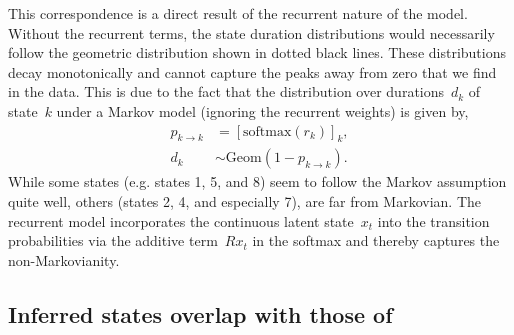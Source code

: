 \documentclass{article}
\begin{document}
This correspondence is a direct result of the recurrent nature of the
model.  Without the recurrent terms, the state duration distributions
would necessarily follow the geometric distribution shown in dotted
black lines.  These distributions decay monotonically and cannot
capture the peaks away from zero that we find in the data.  This is
due to the fact that the distribution over durations~$d_k$ of
state~$k$ under a Markov model (ignoring the recurrent weights) is
given by,
\begin{align*}
  p_{k \to k} &= [\mathrm{softmax}(r_{k})]_k, \\
  d_k &\sim \mathrm{Geom}(1-p_{k \to k}).
\end{align*}
While some states (e.g. states 1, 5, and 8) seem to follow the Markov
assumption quite well, others (states 2, 4, and especially 7), are far
from Markovian.  The recurrent model incorporates the continuous
latent state~$x_t$ into the transition probabilities via the additive
term~$R x_t$ in the softmax and thereby captures the non-Markovianity.

\clearpage


\subsection{Inferred states overlap with those of~\citet{kato2015global}}
\end{document}
